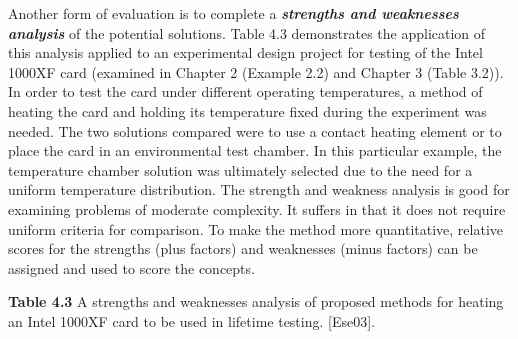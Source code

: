 Another form of evaluation is to complete a \emph{\textbf{strengths and
weaknesses analysis}} of the potential solutions. Table 4.3 demonstrates
the application of this analysis applied to an experi­mental design
project for testing of the Intel 1000XF card (examined in Chapter 2
(Example 2.2) and Chapter 3 (Table 3.2)). In order to test the card
under different operating temperatures, a method of heating the card and
holding its temperature fixed during the experiment was needed. The two
solutions compared were to use a contact heating element or to place the
card in an environmental test chamber. In this particular example, the
temperature chamber solution was ultimately selected due to the need for
a uniform temperature distribution. The strength and weakness analysis
is good for examining problems of moderate complexity. It suffers in
that it does not require uniform criteria for comparison. To make the
method more quantitative, relative scores for the strengths (plus
factors) and weaknesses (minus factors) can be assigned and used to
score the concepts.

\textbf{Table 4.3} A strengths and weaknesses analysis of proposed
methods for heating an Intel 1000XF card to be used in lifetime testing.
{[}Ese03{]}.

